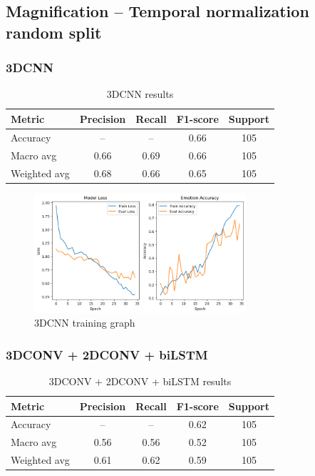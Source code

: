 \documentclass{article}
\begin{document}
\subsection{Magnification – Temporal normalization random split}
\subsubsection{3DCNN}

\begin{table}[H]
\centering
\caption{3DCNN results}
\begin{tabular}{|l|c|c|c|c|}
\hline
\textbf{Metric} & \textbf{Precision} & \textbf{Recall} & \textbf{F1-score} & \textbf{Support} \\
\hline
Accuracy       & --   & --   & 0.66 & 105 \\
Macro avg      & 0.66 & 0.69 & 0.66 & 105 \\
Weighted avg   & 0.68 & 0.66 & 0.65 & 105 \\
\hline
\end{tabular}%
\label{tab:table5}
\end{table}

\begin{figure}[H]
  \begin{center}
    \includegraphics*[width=0.7\textwidth]{Figures/Picture9.png}
  \end{center}
  \caption{3DCNN training graph}
  \label{fig:fig9}
\end{figure}

\subsubsection{3DCONV + 2DCONV + biLSTM}

\begin{table}[H]
\centering
\caption{3DCONV + 2DCONV + biLSTM results}
\begin{tabular}{|l|c|c|c|c|}
\hline
\textbf{Metric} & \textbf{Precision} & \textbf{Recall} & \textbf{F1-score} & \textbf{Support} \\
\hline
Accuracy       & --   & --   & 0.62 & 105 \\
Macro avg      & 0.56 & 0.56 & 0.52 & 105 \\
Weighted avg   & 0.61 & 0.62 & 0.59 & 105 \\
\hline
\end{tabular}%
\label{tab:table6}
\end{table}
\end{document}
